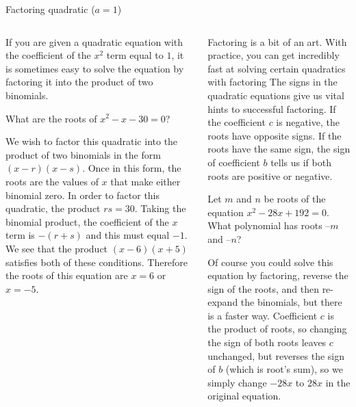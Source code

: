 \documentclass[9pt,aspectratio=169]{beamer}
\begin{document}
\begin{frame}{Factoring quadratic (\MakeLowercase{$a = 1$})}
  \begin{columns}[T]
    \begin{column}{0.5\textwidth}
      If you are given a quadratic equation with the coefficient of the $x^2$ term equal to $1$, it is sometimes easy to solve the equation by factoring it into the product of two binomials.
      \begin{problem}
        What are the roots of $x^2 - x - 30 = 0$?
      \end{problem}

      We wish to factor this quadratic into the product of two binomials in the form $(x - r)(x - s)$.  Once in this form, the roots are the values of $x$ that make either binomial zero.  In order to factor this quadratic, the product $rs = 30$.  Taking the binomial product, the coefficient of the $x$ term is $-(r + s)$ and this must equal $-1$.  We see that the product $(x - 6)(x + 5)$ satisfies both of these conditions.  Therefore the roots of this equation are $x = 6$ or $x = -5$.
    \end{column}
    \begin{column}{0.5\textwidth}
      Factoring is a bit of an art.  With practice, you can get incredibly fast at solving certain quadratics with factoring The signs in the quadratic equations give us vital hints to successful factoring.  If the coefficient $c$ is negative, the roots have opposite signs.  If the roots have the same sign, the sign of coefficient $b$ tells us if both roots are positive or negative.

      \begin{problem}
        Let $m$ and $n$ be roots of the equation $x^2 - 28x + 192 = 0$.  What polynomial has roots $–m$ and $–n$?
      \end{problem}
      Of course you could solve this equation by factoring, reverse the sign of the roots, and then re-expand the binomials, but there is a faster way.  Coefficient $c$ is the product of roots, so changing the sign of both roots leaves $c$ unchanged, but reverses the sign of $b$ (which is root's sum), so we simply change $-28x$ to $28x$ in the original equation.
    \end{column}
  \end{columns}
\end{frame}
\end{document}
